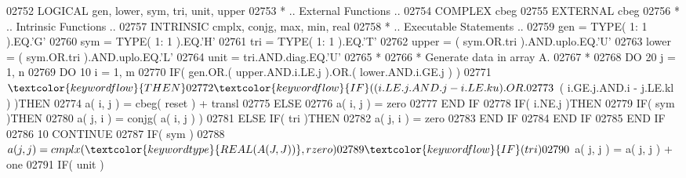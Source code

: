 \begin{DoxyCode}
02752       \textcolor{keywordtype}{LOGICAL}            gen, lower, sym, tri, unit, upper
02753 \textcolor{comment}{*     .. External Functions ..}
02754       \textcolor{keywordtype}{COMPLEX}            cbeg
02755       \textcolor{keywordtype}{EXTERNAL}           cbeg
02756 \textcolor{comment}{*     .. Intrinsic Functions ..}
02757       \textcolor{keywordtype}{INTRINSIC}          cmplx, conjg, max, min, real
02758 \textcolor{comment}{*     .. Executable Statements ..}
02759       gen = \textcolor{keywordtype}{TYPE}( 1: 1 ).EQ.\textcolor{stringliteral}{'G'}
02760       sym = \textcolor{keywordtype}{TYPE}( 1: 1 ).EQ.\textcolor{stringliteral}{'H'}
02761       tri = \textcolor{keywordtype}{TYPE}( 1: 1 ).EQ.\textcolor{stringliteral}{'T'}
02762       upper = ( sym.OR.tri ).AND.uplo.EQ.\textcolor{stringliteral}{'U'}
02763       lower = ( sym.OR.tri ).AND.uplo.EQ.\textcolor{stringliteral}{'L'}
02764       unit = tri.AND.diag.EQ.\textcolor{stringliteral}{'U'}
02765 \textcolor{comment}{*}
02766 \textcolor{comment}{*     Generate data in array A.}
02767 \textcolor{comment}{*}
02768       \textcolor{keywordflow}{DO} 20 j = 1, n
02769          \textcolor{keywordflow}{DO} 10 i = 1, m
02770             \textcolor{keywordflow}{IF}( gen.OR.( upper.AND.i.LE.j ).OR.( lower.AND.i.GE.j ) )
02771      $          \textcolor{keywordflow}{THEN}
02772                \textcolor{keywordflow}{IF}( ( i.LE.j.AND.j - i.LE.ku ).OR.
02773      $             ( i.GE.j.AND.i - j.LE.kl ) )\textcolor{keywordflow}{THEN}
02774                   a( i, j ) = cbeg( reset ) + transl
02775                \textcolor{keywordflow}{ELSE}
02776                   a( i, j ) = zero
02777 \textcolor{keywordflow}{               END IF}
02778                \textcolor{keywordflow}{IF}( i.NE.j )\textcolor{keywordflow}{THEN}
02779                   \textcolor{keywordflow}{IF}( sym )\textcolor{keywordflow}{THEN}
02780                      a( j, i ) = conjg( a( i, j ) )
02781                   \textcolor{keywordflow}{ELSE} \textcolor{keywordflow}{IF}( tri )\textcolor{keywordflow}{THEN}
02782                      a( j, i ) = zero
02783 \textcolor{keywordflow}{                  END IF}
02784 \textcolor{keywordflow}{               END IF}
02785 \textcolor{keywordflow}{            END IF}
02786    10    \textcolor{keywordflow}{CONTINUE}
02787          \textcolor{keywordflow}{IF}( sym )
02788      $      a( j, j ) = cmplx( \textcolor{keywordtype}{REAL( A( J, J ) )}, rzero )
02789          \textcolor{keywordflow}{IF}( tri )
02790      $      a( j, j ) = a( j, j ) + one
02791          \textcolor{keywordflow}{IF}( unit )

\end{DoxyCode}
